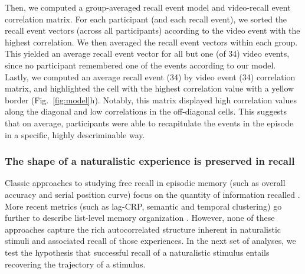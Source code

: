 \documentclass{article}
\begin{document}
{Then, we computed a group-averaged recall event model and video-recall event correlation matrix. For each participant (and each recall event), we sorted the recall event vectors (across all participants) according to the video event with the highest correlation. We then averaged the recall event vectors within each group. This yielded an average recall event vector for all but one (of 34) video events, since no participant remembered one of the events according to our model. Lastly, we computed an average recall event (34) by video event (34) correlation matrix, and highlighted the cell with the highest correlation value with a yellow border (Fig.~\ref{fig:model}h). Notably, this matrix displayed high correlation values along the diagonal and low correlations in the off-diagonal cells. This suggests that on average, participants were able to recapitulate the events in the episode in a specific, highly descriminable way.

\subsubsection{The shape of a naturalistic experience is preserved in recall}
Classic approaches to studying free recall in episodic memory (such as overall accuracy and serial position curve) focus on the quantity of information recalled \citep{Murd62a}. More recent metrics (such as lag-CRP, semantic and temporal clustering) go further to describe list-level memory organization \citep{Kaha96, }. However, none of these approaches capture the rich autocorrelated structure inherent in naturalistic stimuli and associated recall of those experiences. In the next set of analyses, we test the hypothesis that successful recall of a naturalistic stimulus entails recovering the trajectory of a stimulus.

}
\end{document}
